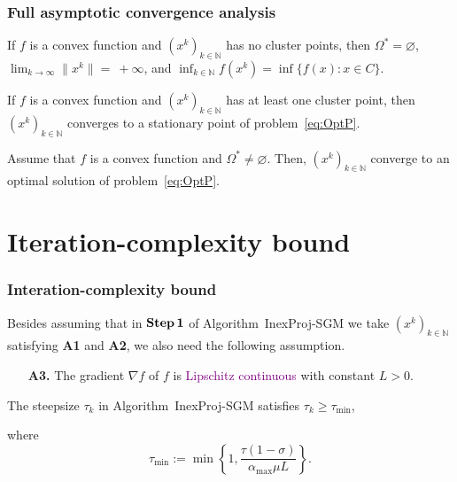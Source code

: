 


\begin{frame}[t]\frametitle{Full asymptotic convergence analysis}


  \begin{theorem}[3.9]
    If $f$ is a convex function and $(x^k)_{k\in\mathbb{N}}$ has no cluster points,  then $\Omega^* = \varnothing$, $\lim_{k \to \infty} \|x^k\|=~+\infty$, and $\inf_{k\in {\mathbb N}} f(x^k) = \inf \{f(x) : x \in C\}$.
  \end{theorem}

  \bigskip\bigskip


  \begin{corollary}[3.10]
    If $f$ is a convex function and $(x^k)_{k\in\mathbb{N}}$ has at least one cluster point, then    $(x^k)_{k\in\mathbb{N}}$ converges to a stationary point of problem~\eqref{eq:OptP}.
  \end{corollary}

  \bigskip\bigskip


  \begin{theorem}[3.11]
    Assume that $f$ is a convex function and  $\Omega^* \neq \varnothing$. Then,   $(x^k)_{k\in\mathbb{N}}$ converge to an optimal solution of problem~\eqref{eq:OptP}.
  \end{theorem}
\end{frame}


\section{Iteration-complexity bound}


\begin{frame}[t]\frametitle{Interation-complexity bound}
  Besides  assuming   that  in ${\bf Step\,1}$ of  Algorithm~InexProj-SGM we take   $(x^k)_{k\in\mathbb{N}}$ satisfying {\bf A1} and {\bf A2},  we also need the following assumption.
  \begin{itemize}
    \item[{\bf A3.}] The  gradient $\nabla f$ of $f$ is  \textcolor{purple}{Lipschitz continuous} with constant $L>0$.
  \end{itemize}

  \bigskip\bigskip



  \begin{lemma}[3.12]
    The steepsize $\tau_k$ in Algorithm~InexProj-SGM satisfies $\tau_k \geq \tau_{\min}$,
  \end{lemma}
  where
  \begin{equation*}
    \tau_{\min} := \min \left\{1, \frac{\tau(1-\sigma)}{{\alpha_{\max}}\mu L}\right\}.
  \end{equation*}
\end{frame}



